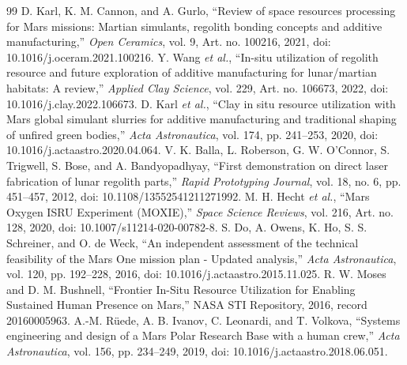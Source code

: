 \documentclass[conference]{../../../../Conference-LaTeX-template_10-17-19/IEEEtran}
\begin{document}
\begin{thebibliography}{99}
 D. Karl, K. M. Cannon, and A. Gurlo, ``Review of space resources processing for Mars missions: Martian simulants, regolith bonding concepts and additive manufacturing,'' \emph{Open Ceramics}, vol. 9, Art. no. 100216, 2021, doi: 10.1016/j.oceram.2021.100216.
 Y. Wang \emph{et al.}, ``In-situ utilization of regolith resource and future exploration of additive manufacturing for lunar/martian habitats: A review,'' \emph{Applied Clay Science}, vol. 229, Art. no. 106673, 2022, doi: 10.1016/j.clay.2022.106673.
 D. Karl \emph{et al.}, ``Clay in situ resource utilization with Mars global simulant slurries for additive manufacturing and traditional shaping of unfired green bodies,'' \emph{Acta Astronautica}, vol. 174, pp. 241--253, 2020, doi: 10.1016/j.actaastro.2020.04.064.
 V. K. Balla, L. Roberson, G. W. O'Connor, S. Trigwell, S. Bose, and A. Bandyopadhyay, ``First demonstration on direct laser fabrication of lunar regolith parts,'' \emph{Rapid Prototyping Journal}, vol. 18, no. 6, pp. 451--457, 2012, doi: 10.1108/13552541211271992.
 M. H. Hecht \emph{et al.}, ``Mars Oxygen ISRU Experiment (MOXIE),'' \emph{Space Science Reviews}, vol. 216, Art. no. 128, 2020, doi: 10.1007/s11214-020-00782-8.
 S. Do, A. Owens, K. Ho, S. S. Schreiner, and O. de Weck, ``An independent assessment of the technical feasibility of the Mars One mission plan - Updated analysis,'' \emph{Acta Astronautica}, vol. 120, pp. 192--228, 2016, doi: 10.1016/j.actaastro.2015.11.025.
 R. W. Moses and D. M. Bushnell, ``Frontier In-Situ Resource Utilization for Enabling Sustained Human Presence on Mars,'' NASA STI Repository, 2016, record 20160005963.
 A.-M. Rüede, A. B. Ivanov, C. Leonardi, and T. Volkova, ``Systems engineering and design of a Mars Polar Research Base with a human crew,'' \emph{Acta Astronautica}, vol. 156, pp. 234--249, 2019, doi: 10.1016/j.actaastro.2018.06.051.
\end{thebibliography}
\end{document}

